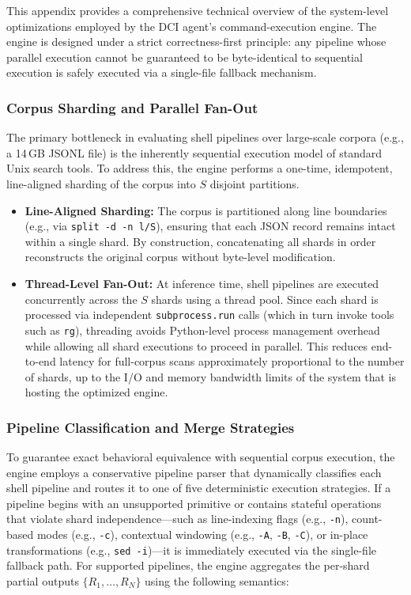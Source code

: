 \documentclass{article} %
\begin{document}

This appendix provides a comprehensive technical overview of the system-level optimizations employed by the DCI agent’s command-execution engine. The engine is designed under a strict correctness-first principle: any pipeline whose parallel execution cannot be guaranteed to be byte-identical to sequential execution is safely executed via a single-file fallback mechanism.


\subsubsection{Corpus Sharding and Parallel Fan-Out}


The primary bottleneck in evaluating shell pipelines over large-scale corpora (e.g., a 14\,GB JSONL file) is the inherently sequential execution model of standard Unix search tools. To address this, the engine performs a one-time, idempotent, line-aligned sharding of the corpus into $S$ disjoint partitions.

\begin{itemize}[leftmargin=1.2em]
    \item \textbf{Line-Aligned Sharding:} The corpus is partitioned along line boundaries (e.g., via \texttt{split -d -n l/S}), ensuring that each JSON record remains intact within a single shard. By construction, concatenating all shards in order reconstructs the original corpus without byte-level modification.

    \item \textbf{Thread-Level Fan-Out:} At inference time, shell pipelines are executed concurrently across the $S$ shards using a thread pool. Since each shard is processed via independent \texttt{subprocess.run} calls (which in turn invoke tools such as \texttt{rg}), threading avoids Python-level process management overhead while allowing all shard executions to proceed in parallel. This reduces end-to-end latency for full-corpus scans approximately proportional to the number of shards, up to the I/O and memory bandwidth limits of the system that is hosting the optimized engine.
\end{itemize}

\subsubsection{Pipeline Classification and Merge Strategies}

To guarantee exact behavioral equivalence with sequential corpus execution, the engine employs a conservative pipeline parser that dynamically classifies each shell pipeline and routes it to one of five deterministic execution strategies. If a pipeline begins with an unsupported primitive or contains stateful operations that violate shard independence---such as line-indexing flags (e.g., \texttt{-n}), count-based modes (e.g., \texttt{-c}), contextual windowing (e.g., \texttt{-A}, \texttt{-B}, \texttt{-C}), or in-place transformations (e.g., \texttt{sed -i})---it is immediately executed via the single-file fallback path. For supported pipelines, the engine aggregates the per-shard partial outputs $\{R_1, \dots, R_N\}$ using the following semantics:
\end{document}
